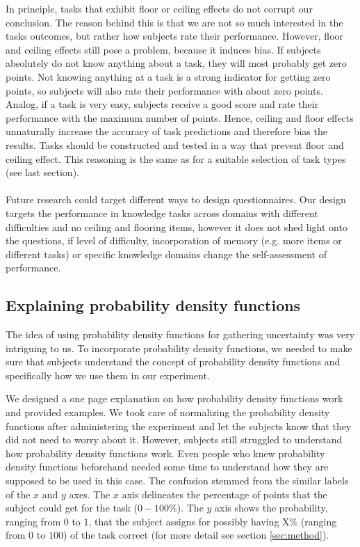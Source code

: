 \documentclass[../main/main.tex]{subfiles}
\begin{document}
	In principle, tasks that exhibit floor or ceiling effects do not corrupt our conclusion. The reason behind this is that we are not so much interested in the tasks outcomes, but rather how subjects rate their performance. However, floor and ceiling effects still pose a problem, because it induces bias. If subjects absolutely do not know anything about a task, they will most probably get zero points. Not knowing anything at a task is a strong indicator for getting zero points, so subjects will also rate their performance with about zero points. Analog, if a task is very easy, subjects receive a good score and rate their performance with the maximum number of points. Hence, ceiling and floor effects unnaturally increase the accuracy of task predictions and therefore bias the results. Tasks should be constructed and tested in a way that prevent floor and ceiling effect. This reasoning is the same as for a suitable selection of task types (see last section).
	\\\\
	Future research could target different ways to design questionnaires. Our design targets the performance in knowledge tasks across domains with different difficulties and no ceiling and flooring items, however it does not shed light onto the questions, if level of difficulty, incorporation of memory (e.g. more items or different tasks) or specific knowledge domains change the self-assessment of performance.
	
	
	\subsection{Explaining probability density functions}
	\label{sec:explaining_pdf}
	
	The idea of using probability density functions for gathering uncertainty was very intriguing to us. To incorporate probability density functions, we needed to make sure that subjects understand the concept of probability density functions and specifically how we use them in our experiment. 
	
	We designed a one page explanation on how probability density functions work and provided examples. We took care of normalizing the probability density functions after administering the experiment and let the subjects know that they did not need to worry about it. However, subjects still  struggled to understand how probability density functions work. Even people who knew probability density functions beforehand needed some time to understand how they are supposed to be used in this case. The confusion stemmed from the similar labels of the $x$ and $y$ axes. The $x$ axis delineates the percentage of points that the subject could get for the task ($0-100\%$). The $y$ axis shows the probability, ranging from $0$ to $1$, that the subject assigns for possibly having X\% (ranging from $0$ to $100$) of the task correct (for more detail see section \ref{sec:method}).
	
\end{document}
